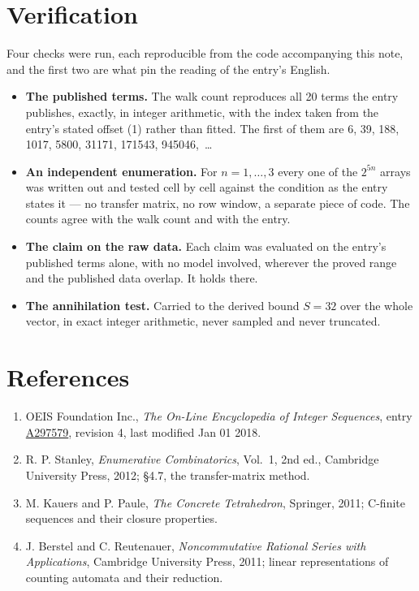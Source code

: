 \documentclass[11pt]{article}
\theoremstyle{definition}
\begin{document}
\section{Verification}

Four checks were run, each reproducible from the code accompanying this note, and the first two are what pin the reading of the entry's English.

\begin{itemize}

\item {\bfseries The published terms.} The walk count reproduces all 20 terms the entry publishes, exactly, in integer arithmetic, with the index taken from the entry's stated offset (1) rather than fitted. The first of them are 6, 39, 188, 1017, 5800, 31171, 171543, 945046,~\dots

\item {\bfseries An independent enumeration.} For $n = 1,\dots,3$ every one of the $2^{5n}$ arrays was written out and tested cell by cell against the condition as the entry states it --- no transfer matrix, no row window, a separate piece of code. The counts agree with the walk count and with the entry.

\item {\bfseries The claim on the raw data.} Each claim was evaluated on the entry's published terms alone, with no model involved, wherever the proved range and the published data overlap. It holds there.

\item {\bfseries The annihilation test.} Carried to the derived bound $S = 32$ over the whole vector, in exact integer arithmetic, never sampled and never truncated.

\end{itemize}

\section{References}

\begin{enumerate}

\item OEIS Foundation Inc., \emph{The On-Line Encyclopedia of Integer Sequences}, entry \href{https://oeis.org/A297579}{A297579}, revision 4, last modified Jan 01 2018.

\item R. P. Stanley, \emph{Enumerative Combinatorics}, Vol.~1, 2nd ed., Cambridge University Press, 2012; \S4.7, the transfer-matrix method.

\item M. Kauers and P. Paule, \emph{The Concrete Tetrahedron}, Springer, 2011; C-finite sequences and their closure properties.

\item J. Berstel and C. Reutenauer, \emph{Noncommutative Rational Series with Applications}, Cambridge University Press, 2011; linear representations of counting automata and their reduction.

\end{enumerate}
\end{document}
